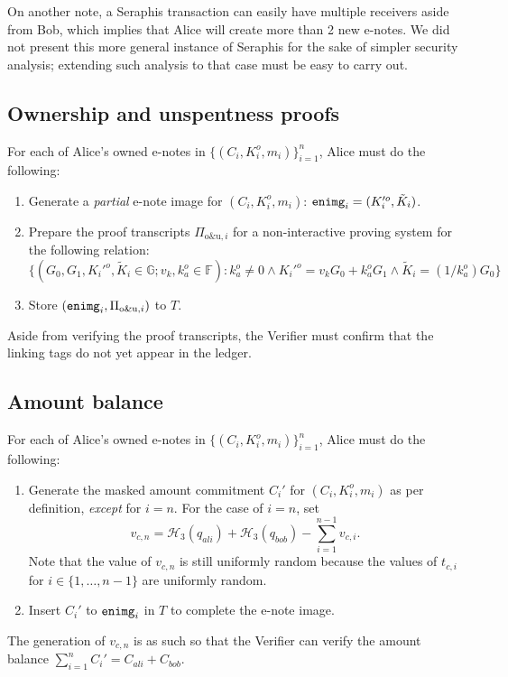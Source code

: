 \documentclass{article}
\begin{document}
On another note, a Seraphis transaction can easily have multiple receivers aside from Bob, which implies that Alice will create more than 2 new e-notes. We did not present this more general instance of Seraphis for the sake of simpler security analysis; extending such analysis to that case must be easy to carry out.

\subsection{Ownership and unspentness proofs}
For each of Alice's owned e-notes in $\{(C_i,K_i^o,m_i)\}_{i=1}^n$, Alice must do the following:
\begin{enumerate}
    \item Generate a \textit{partial} e-note image for $(C_i, K_i^o, m_i)$: ${\tt enimg}_i=(K_i'^o, \tilde{K}_i)$.
    \item Prepare the proof transcripts $\Pi_{\text{o\&u}, i}$ for a non-interactive proving system for the following relation:
$$\{(G_0, G_1, K_i'^o, \tilde{K}_i\in\mathbb{G}; v_k, k_a^o\in\mathbb{F}): k_a^o \ne 0 \wedge K_i'^o = v_k G_0 + k_a^o G_1 \wedge \tilde{K}_i = (1/k_a^o)G_0 \}$$
    \item Store $({\tt enimg}_i, \Pi_{\text{o\&u}, i})$ to $T$.
\end{enumerate}
Aside from verifying the proof transcripts, the Verifier must confirm that the linking tags do not yet appear in the ledger.

\subsection{Amount balance}
For each of Alice's owned e-notes in $\{(C_i,K_i^o,m_i)\}_{i=1}^n$, Alice must do the following:
\begin{enumerate}
    \item Generate the masked amount commitment $C_i'$ for $(C_i, K_i^o, m_i)$ as per definition, \textit{except} for $i=n$. For the case of $i=n$, set
    $$v_{c,n} = \mathcal{H}_3(q_{ali}) + \mathcal{H}_3(q_{bob}) - \sum_{i=1}^{n-1}{v_{c,i}}.$$
    Note that the value of $v_{c,n}$ is still uniformly random because the values of $t_{c,i}$ for $i\in\{1,\ldots,n-1\}$ are uniformly random.
    \item Insert $C_i'$ to ${\tt enimg}_i$ in $T$ to complete the e-note image.
\end{enumerate}
The generation of $v_{c,n}$ is as such so that the Verifier can verify the amount balance $\sum_{i=1}^n{C_i'}=C_{ali}+C_{bob}$.
\end{document}
